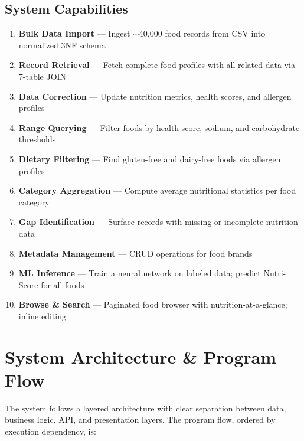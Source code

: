 \documentclass[12pt,a4paper]{article}
\begin{document}
\subsection{System Capabilities}
\begin{enumerate}[nosep]
    \item \textbf{Bulk Data Import} — Ingest $\sim$40,000 food records from CSV into normalized 3NF schema
    \item \textbf{Record Retrieval} — Fetch complete food profiles with all related data via 7-table JOIN
    \item \textbf{Data Correction} — Update nutrition metrics, health scores, and allergen profiles
    \item \textbf{Range Querying} — Filter foods by health score, sodium, and carbohydrate thresholds
    \item \textbf{Dietary Filtering} — Find gluten-free and dairy-free foods via allergen profiles
    \item \textbf{Category Aggregation} — Compute average nutritional statistics per food category
    \item \textbf{Gap Identification} — Surface records with missing or incomplete nutrition data
    \item \textbf{Metadata Management} — CRUD operations for food brands
    \item \textbf{ML Inference} — Train a neural network on labeled data; predict Nutri-Score for all foods
    \item \textbf{Browse \& Search} — Paginated food browser with nutrition-at-a-glance; inline editing
\end{enumerate}

\section{System Architecture \& Program Flow}

The system follows a layered architecture with clear separation between data, business logic, API, and presentation layers. The program flow, ordered by execution dependency, is:
\end{document}
